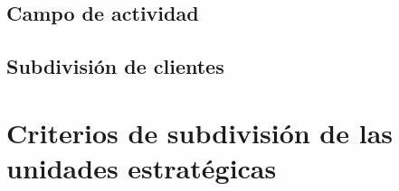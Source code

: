 \documentclass[compress, aspectratio=169]{beamer} %
\begin{document}
	\subsection{Campo de actividad}
	\begin{frame}
	\transdissolve[duration=1]
	
	

		
	\end{frame}

	\subsection{Subdivisión de clientes}
		

\section{Criterios de subdivisión de las unidades estratégicas}

	\begin{frame}
	\transdissolve[duration=1]

		\huge\centerline{\insertsection}
	\end{frame}
	
\end{document}

